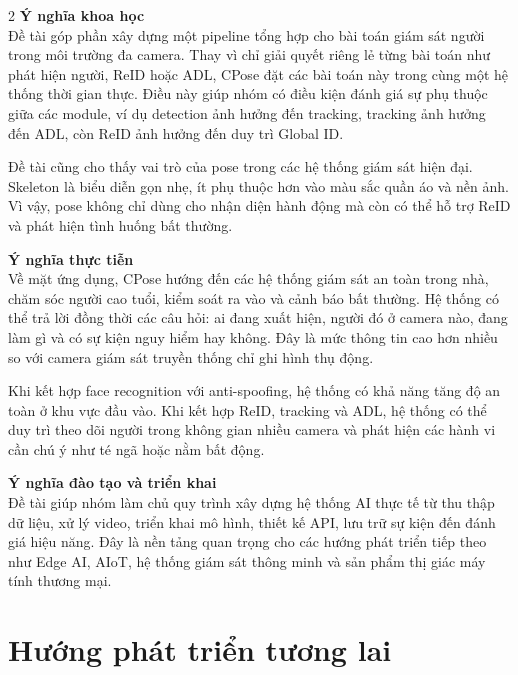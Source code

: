 \documentclass[a4paper, twoside, 12pt]{article}
\begin{document}
\begin{multicols}{2}
\hspace*{0.5cm}\textbf{Ý nghĩa khoa học}\\
Đề tài góp phần xây dựng một pipeline tổng hợp cho bài toán giám sát người trong môi trường đa camera. Thay vì chỉ giải quyết riêng lẻ từng bài toán như phát hiện người, ReID hoặc ADL, CPose đặt các bài toán này trong cùng một hệ thống thời gian thực. Điều này giúp nhóm có điều kiện đánh giá sự phụ thuộc giữa các module, ví dụ detection ảnh hưởng đến tracking, tracking ảnh hưởng đến ADL, còn ReID ảnh hưởng đến duy trì Global ID.

Đề tài cũng cho thấy vai trò của pose trong các hệ thống giám sát hiện đại. Skeleton là biểu diễn gọn nhẹ, ít phụ thuộc hơn vào màu sắc quần áo và nền ảnh. Vì vậy, pose không chỉ dùng cho nhận diện hành động mà còn có thể hỗ trợ ReID và phát hiện tình huống bất thường.

\vspace{0.1cm}
\hspace*{0.5cm}\textbf{Ý nghĩa thực tiễn}\\
Về mặt ứng dụng, CPose hướng đến các hệ thống giám sát an toàn trong nhà, chăm sóc người cao tuổi, kiểm soát ra vào và cảnh báo bất thường. Hệ thống có thể trả lời đồng thời các câu hỏi: ai đang xuất hiện, người đó ở camera nào, đang làm gì và có sự kiện nguy hiểm hay không. Đây là mức thông tin cao hơn nhiều so với camera giám sát truyền thống chỉ ghi hình thụ động.

Khi kết hợp face recognition với anti-spoofing, hệ thống có khả năng tăng độ an toàn ở khu vực đầu vào. Khi kết hợp ReID, tracking và ADL, hệ thống có thể duy trì theo dõi người trong không gian nhiều camera và phát hiện các hành vi cần chú ý như té ngã hoặc nằm bất động.

\vspace{0.1cm}
\hspace*{0.5cm}\textbf{Ý nghĩa đào tạo và triển khai}\\
Đề tài giúp nhóm làm chủ quy trình xây dựng hệ thống AI thực tế từ thu thập dữ liệu, xử lý video, triển khai mô hình, thiết kế API, lưu trữ sự kiện đến đánh giá hiệu năng. Đây là nền tảng quan trọng cho các hướng phát triển tiếp theo như Edge AI, AIoT, hệ thống giám sát thông minh và sản phẩm thị giác máy tính thương mại.

\vspace{0.2cm}

\section{Hướng phát triển tương lai}
\vspace{-0.6cm}


\end{multicols}
\end{document}
